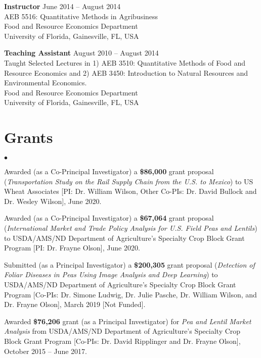 \documentclass[margin,line]{res}
\newenvironment{list2}{
  \begin{list}{$\bullet$}{%
    \setlength{\itemsep}{0in}
    \setlength{\parsep}{0in} \setlength{\parskip}{0in}
    \setlength{\topsep}{0in} \setlength{\partopsep}{0in}
    \setlength{\leftmargin}{0.2in}}}{\end{list}}
\begin{document}
\begin{resume}
{\bf Instructor} \hfill{June 2014 -- August 2014} \\
AEB 5516: Quantitative Methods in Agribusiness \\
Food and Resource Economics Department \\
University of Florida, Gainesville, FL, USA 

{\bf Teaching Assistant} \hfill{August 2010 -- August 2014} \\
Taught Selected Lectures in 1) AEB 3510: Quantitative Methods of Food and Resource Economics and 2) AEB 3450: Introduction to Natural Resources and Environmental Economics.\\
Food and Resource Economics Department \\
University of Florida, Gainesville, FL, USA 
\section{\sc Grants}
\begin{list2}
\item Awarded (as a Co-Principal Investigator) a \textbf{\$86,000} grant proposal ({\em Transportation Study on the Rail Supply Chain from the U.S. to Mexico}) to US Wheat Associates [PI: Dr. William Wilson, Other Co-PIs: Dr. David Bullock and Dr. Wesley Wilson], June 2020.
\item Awarded (as a Co-Principal Investigator) a \textbf{\$67,064} grant proposal ({\em International Market and Trade Policy Analysis for U.S. Field Peas and Lentils}) to USDA/AMS/ND Department of Agriculture's Specialty Crop Block Grant Program [PI: Dr. Frayne Olson], June 2020.
\item Submitted (as a Principal Investigator) a \textbf{\$200,305} grant proposal ({\em Detection of Foliar Diseases in Peas Using Image Analysis and Deep Learning}) to USDA/AMS/ND Department of Agriculture's Specialty Crop Block Grant Program [Co-PIs: Dr. Simone Ludwig, Dr. Julie Pasche, Dr. William Wilson, and Dr. Frayne Olson], March 2019 [Not Funded].
\item Awarded \textbf{\$76,206} grant (as a Principal Investigator) for {\em Pea and Lentil Market Analysis} from USDA/AMS/ND  Department of Agriculture's Specialty Crop Block Grant Program [Co-PIs: Dr. David Ripplinger and Dr. Frayne Olson], October 2015 -- June 2017.
\end{list2}


\end{resume}
\end{document}
